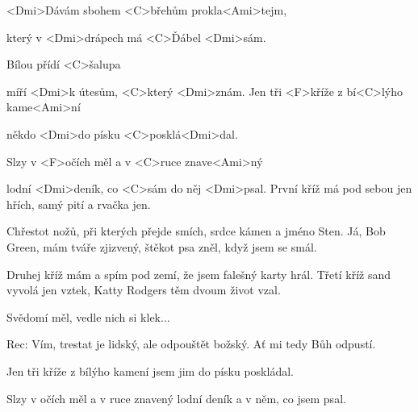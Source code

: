 
\zs
<Dmi>Dávám sbohem <C>břehům prokla<Ami>tejm,

který v <Dmi>drápech má <C>Ďábel <Dmi>sám.

Bílou přídí <C>šalupa 

míří <Dmi>k útesům, <C>který <Dmi>znám.
\ks
\zr
Jen tři <F>kříže z bí<C>lýho kame<Ami>ní

někdo <Dmi>do písku <C>posklá<Dmi>dal.

Slzy v <F>očích měl a v <C>ruce znave<Ami>ný

lodní <Dmi>deník, co <C>sám do něj <Dmi>psal.
\kr
\zs
První kříž má pod sebou jen hřích, samý pití a rvačka jen.

Chřestot nožů, při kterých přejde smích, srdce kámen a jméno Sten.
\ks
\zr \kr
\zs
Já, Bob Green, mám tváře zjizvený, štěkot psa zněl, když jsem se smál.

Druhej kříž mám a spím pod zemí, že jsem falešný karty hrál.
\ks
\zr \kr
\zs
Třetí kříž sand vyvolá jen vztek, Katty Rodgers těm dvoum život vzal.

Svědomí měl, vedle nich si klek...
\ks

Rec: Vím, trestat je lidský, ale odpouštět božský. Ať mi tedy Bůh odpustí.

\zr
Jen tři kříže z bílýho kamení jsem jim do písku poskládal.

Slzy v očích měl a v ruce znavený lodní deník a v něm, co jsem psal.
\kr
\kp
